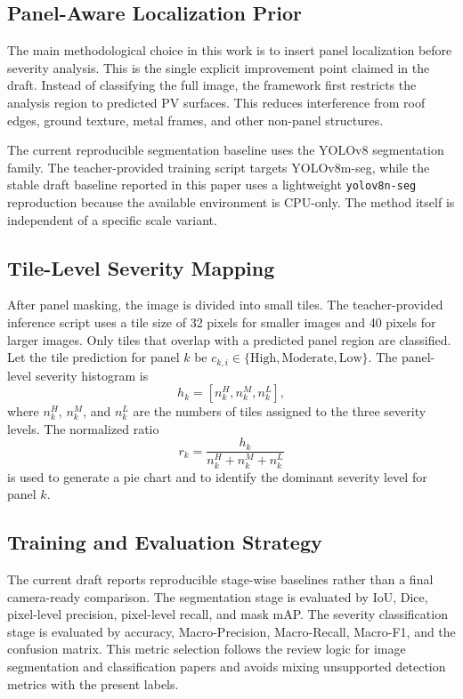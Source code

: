\documentclass[conference]{IEEEtran}
\begin{document}
\subsection{Panel-Aware Localization Prior}
The main methodological choice in this work is to insert panel localization before severity analysis. This is the single explicit improvement point claimed in the draft. Instead of classifying the full image, the framework first restricts the analysis region to predicted PV surfaces. This reduces interference from roof edges, ground texture, metal frames, and other non-panel structures.

The current reproducible segmentation baseline uses the YOLOv8 segmentation family. The teacher-provided training script targets YOLOv8m-seg, while the stable draft baseline reported in this paper uses a lightweight \texttt{yolov8n-seg} reproduction because the available environment is CPU-only. The method itself is independent of a specific scale variant.

\subsection{Tile-Level Severity Mapping}
After panel masking, the image is divided into small tiles. The teacher-provided inference script uses a tile size of 32 pixels for smaller images and 40 pixels for larger images. Only tiles that overlap with a predicted panel region are classified. Let the tile prediction for panel $k$ be $c_{k,i} \in \{\text{High}, \text{Moderate}, \text{Low}\}$. The panel-level severity histogram is
\begin{equation}
h_k = [n_k^{H}, n_k^{M}, n_k^{L}],
\end{equation}
where $n_k^{H}$, $n_k^{M}$, and $n_k^{L}$ are the numbers of tiles assigned to the three severity levels. The normalized ratio
\begin{equation}
r_k = \frac{h_k}{n_k^{H} + n_k^{M} + n_k^{L}}
\end{equation}
is used to generate a pie chart and to identify the dominant severity level for panel $k$.

\subsection{Training and Evaluation Strategy}
The current draft reports reproducible stage-wise baselines rather than a final camera-ready comparison. The segmentation stage is evaluated by IoU, Dice, pixel-level precision, pixel-level recall, and mask mAP. The severity classification stage is evaluated by accuracy, Macro-Precision, Macro-Recall, Macro-F1, and the confusion matrix. This metric selection follows the review logic for image segmentation and classification papers and avoids mixing unsupported detection metrics with the present labels.
\end{document}
